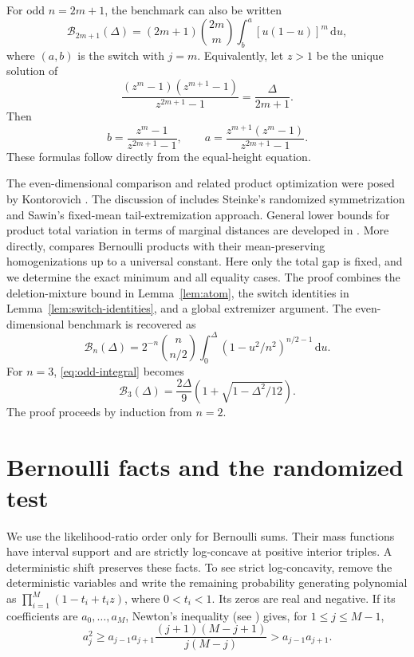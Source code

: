 \documentclass[11pt]{article}
\numberwithin{equation}{section}
\theoremstyle{remark}\newtheorem{remark}[theorem]{Remark}
\newcommand{\dd}{\,\mathrm d}
\newcommand{\Bcal}{\mathcal B}
\begin{document}
For odd $n=2m+1$,
the benchmark can also be written
\begin{equation}\label{eq:odd-integral}
 \Bcal_{2m+1}(\Delta)=(2m+1)\binom{2m}{m}
 \int_b^a [u(1-u)]^m\dd u,
\end{equation}
where $(a,b)$ is the switch with $j=m$. Equivalently, let $z>1$ be the
unique solution of
\[
 \frac{(z^m-1)(z^{m+1}-1)}{z^{2m+1}-1}=\frac{\Delta}{2m+1}.
\]
Then
\[
 b=\frac{z^m-1}{z^{2m+1}-1},\qquad
 a=\frac{z^{m+1}(z^m-1)}{z^{2m+1}-1}.
\]
These formulas follow directly from the equal-height equation.


The even-dimensional comparison and related product optimization were posed
by Kontorovich \cite{KontorovichMO,KontorovichTV}. The discussion of
\cite{KontorovichMO} includes Steinke's randomized symmetrization and
Sawin's fixed-mean tail-extremization approach. General lower bounds for
product total variation in terms of marginal distances are developed in
\cite{KontorovichTensorization}. More directly,
\cite[Theorem~1.5]{KontorovichHomogenization} compares Bernoulli products
with their mean-preserving homogenizations up to a universal constant.
Here only the total gap is fixed, and we determine the exact minimum and
all equality cases. The proof combines the deletion-mixture bound in
Lemma~\ref{lem:atom}, the switch identities in
Lemma~\ref{lem:switch-identities}, and a global extremizer argument.
The even-dimensional benchmark is recovered as
\[
 \Bcal_n(\Delta)=2^{-n}\binom n{n/2}
 \int_0^\Delta(1-u^2/n^2)^{n/2-1}\dd u.
\]
For $n=3$, \eqref{eq:odd-integral} becomes
\[
 \Bcal_3(\Delta)=\frac{2\Delta}{9}
 \left(1+\sqrt{1-\Delta^2/12}\right).
\]
The proof proceeds by induction from $n=2$.

\section{Bernoulli facts and the randomized test}\label{sec:bernoulli}
We use the likelihood-ratio order only for Bernoulli sums. Their mass
functions have interval support and are strictly log-concave at positive
interior triples. A deterministic shift preserves these facts. To see
strict log-concavity, remove the deterministic variables and write the
remaining probability generating polynomial as
$\prod_{i=1}^M(1-t_i+t_i z)$, where $0<t_i<1$. Its zeros are real and
negative. If its coefficients are $a_0,\ldots,a_M$, Newton's inequality
(see \cite{Pitman}) gives, for $1\le j\le M-1$,
\[
 a_j^2\ge a_{j-1}a_{j+1}
 \frac{(j+1)(M-j+1)}{j(M-j)}>a_{j-1}a_{j+1}.
\]
\end{document}
